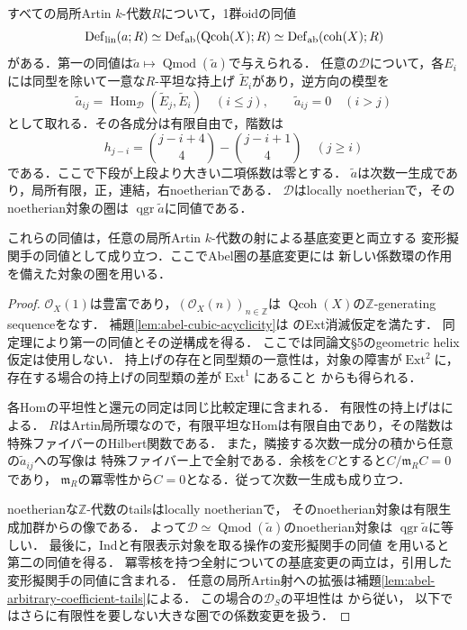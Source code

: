 \begin{theorem}[既知の変形比較の三次三様体への適用]
\label{thm:abel-cubic-all-artin}
すべての局所Artin $k$-代数$R$について，1群oidの同値
\[
 \operatorname{Def}_{\rm lin}(a;R)
 \simeq\operatorname{Def}_{\rm ab}(\operatorname{Qcoh}(X);R)
 \simeq\operatorname{Def}_{\rm ab}(\operatorname{coh}(X);R)
\]
がある．第一の同値は$\widetilde a\mapsto\operatorname{Qmod}(\widetilde a)$で与えられる．
任意の$\mathcal D$について，各$E_i$には同型を除いて一意な$R$-平坦な持上げ
$\widetilde E_i$があり，逆方向の模型を
\[
 \widetilde a_{ij}=
 \operatorname{Hom}_{\mathcal D}(\widetilde E_j,\widetilde E_i)
 \quad(i\leq j),\qquad \widetilde a_{ij}=0\quad(i>j)
\]
として取れる．その各成分は有限自由で，階数は
\[
 h_{j-i}=\binom{j-i+4}{4}-\binom{j-i+1}{4}
 \quad(j\geq i)
\]
である．ここで下段が上段より大きい二項係数は零とする．
$\widetilde a$は次数一生成であり，局所有限，正，連結，右noetherianである．
$\mathcal D$はlocally noetherianで，そのnoetherian対象の圏は
$\operatorname{qgr}\widetilde a$に同値である．

これらの同値は，任意の局所Artin $k$-代数の射による基底変更と両立する
変形擬関手の同値として成り立つ．ここでAbel圏の基底変更には
新しい係数環の作用を備えた対象の圏を用いる．
\end{theorem}
\begin{proof}
$\mathcal O_X(1)$は豊富であり，$(\mathcal O_X(n))_{n\in\mathbb Z}$は
$\operatorname{Qcoh}(X)$の$\mathbb Z$-generating sequenceをなす．
補題\ref{lem:abel-cubic-acyclicity}は
\cite[Theorem~4.5, pp.~495--496]{DeDekenLowen}のExt消滅仮定を満たす．
同定理により第一の同値とその逆構成を得る．
ここでは同論文\S5のgeometric helix仮定は使用しない．
持上げの存在と同型類の一意性は，対象の障害が$\operatorname{Ext}^2$に，
存在する場合の持上げの同型類の差が$\operatorname{Ext}^1$にあること
\cite[Theorems~6.11--6.12の双対版]{LowenObstruction}からも得られる．

各Homの平坦性と還元の同定は同じ比較定理に含まれる．
有限性の持上げは\cite[Proposition~4.6]{DeDekenLowen}による．
$R$はArtin局所環なので，有限平坦なHomは有限自由であり，その階数は
特殊ファイバーのHilbert関数である．
また，隣接する次数一成分の積から任意の$\widetilde a_{ij}$への写像は
特殊ファイバー上で全射である．余核を$C$とすると$C/\mathfrak m_R C=0$であり，
$\mathfrak m_R$の冪零性から$C=0$となる．従って次数一生成も成り立つ．

noetherianな$\mathbb Z$-代数のtailsはlocally noetherianで，
そのnoetherian対象は有限生成加群からの像である．
よって$\mathcal D\simeq\operatorname{Qmod}(\widetilde a)$のnoetherian対象は
$\operatorname{qgr}\widetilde a$に等しい．
最後に，Indと有限表示対象を取る操作の変形擬関手の同値
\cite[Theorem~8.8, p.~5472]{LowenVdBDeformation}を用いると第二の同値を得る．
冪零核を持つ全射についての基底変更の両立は，引用した変形擬関手の同値に含まれる．
任意の局所Artin射への拡張は補題\ref{lem:abel-arbitrary-coefficient-tails}による．
この場合の$\mathcal D_S$の平坦性は
\cite[Proposition~4.8(5)]{LowenVdBDeformation}から従い，
以下ではさらに有限性を要しない大きな圏での係数変更を扱う．
\end{proof}

